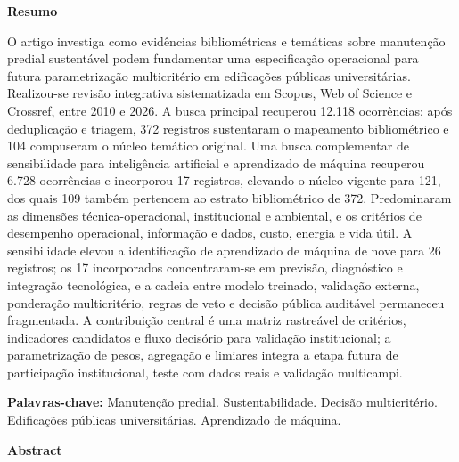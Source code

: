 \begin{center}
\textbf{Resumo}
\end{center}

\noindent O artigo investiga como evidências bibliométricas e temáticas sobre manutenção predial sustentável podem fundamentar uma especificação operacional para futura parametrização multicritério em edificações públicas universitárias. Realizou-se revisão integrativa sistematizada em Scopus, Web of Science e Crossref, entre 2010 e 2026. A busca principal recuperou 12.118 ocorrências; após deduplicação e triagem, 372 registros sustentaram o mapeamento bibliométrico e 104 compuseram o núcleo temático original. Uma busca complementar de sensibilidade para inteligência artificial e aprendizado de máquina recuperou 6.728 ocorrências e incorporou 17 registros, elevando o núcleo vigente para 121, dos quais 109 também pertencem ao estrato bibliométrico de 372. Predominaram as dimensões técnica-operacional, institucional e ambiental, e os critérios de desempenho operacional, informação e dados, custo, energia e vida útil. A sensibilidade elevou a identificação de aprendizado de máquina de nove para 26 registros; os 17 incorporados concentraram-se em previsão, diagnóstico e integração tecnológica, e a cadeia entre modelo treinado, validação externa, ponderação multicritério, regras de veto e decisão pública auditável permaneceu fragmentada. A contribuição central é uma matriz rastreável de critérios, indicadores candidatos e fluxo decisório para validação institucional; a parametrização de pesos, agregação e limiares integra a etapa futura de participação institucional, teste com dados reais e validação multicampi.

\medskip
\noindent\textbf{Palavras-chave:} Manutenção predial. Sustentabilidade. Decisão multicritério. Edificações públicas universitárias. Aprendizado de máquina.

\bigskip

\begin{center}
\textbf{Abstract}
\end{center}

